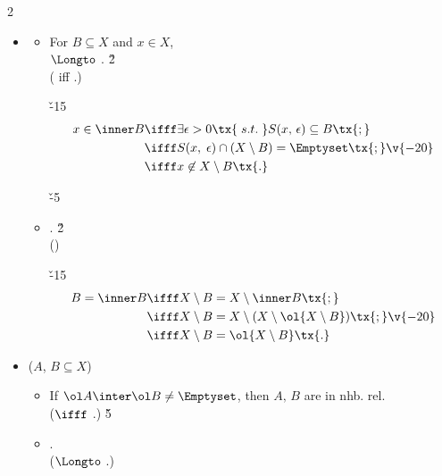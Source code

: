 \documentclass[dvipdfmx,a4paper,titlepage,9pt]{jsarticle}
\begin{document}
\begin{multicols*}{2}
\begin{itemize}[label=-]
\begin{itemize}[label={\Cdot}]
\item{}
\begin{itemize}[label=-]
\setlength{\leftskip}{-10pt}
\item For $B\subseteq X$ and $x\in X$, \\
$\Longto$ \;. \v2\\
\qquad( \quad iff \quad {}.)
\begin{Pfbox}
\v{-15}
$$\begin{aligned}
x\in\inner B &\ifff \exists\epsilon>0\tx{\;s.t.\;}S(x,\,\epsilon)\subseteq B\tx{;} \\
             &\ifff S(x,\;\epsilon)\cap (X\setminus B)=\Emptyset\tx{;}\\
             &\ifff x\not\in{X\setminus B}\tx{.}
\end{aligned}\v{-20}$$
\end{Pfbox}
\;\v{-5}
\item {}. \v2\\
()
\begin{Pfbox}
\v{-15}
$$\begin{aligned}
B=\inner B &\ifff X\setminus B=X\setminus \inner B\tx{;} \\
           &\ifff X\setminus B=X\setminus(X\setminus\ol{X\setminus B})\tx{;} \\
           &\ifff X\setminus B=\ol{X\setminus B}\tx{.}
\end{aligned}\v{-20}$$
\end{Pfbox}
\;
\end{itemize}

\item{} ($A$, $B\subseteq X$)
\begin{itemize}[label=-]
\item If $\ol A\inter\ol B\neq\Emptyset$, then $A,\,B$ are in nhb. \!rel. \\
($\ifff$ .) \v5
\item {}.\\
($\Longto$ .)
\end{itemize}
\end{itemize}
\end{itemize}


\end{multicols*}
\end{document}
